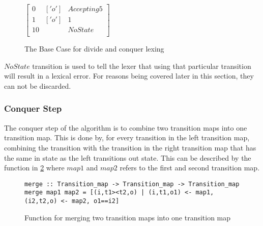\begin{figure}[!ht]
\begin{center}
$\left[\begin{array}{ccc}
0&['o']&Accepting 5\\
1&['o']&1\\
10& &NoState\\
\end{array}\right]$
\caption{The Base Case for divide and conquer lexing \label{fig:bascas}}
\end{center}
\end{figure}

$NoState$ transition is used to tell the lexer that using that particular 
transition will result in a lexical error. For reasons being covered later in
this section, they can not be discarded.

\subsubsection{Conquer Step}
The conquer step of the algorithm is to combine two transition maps into one
transition map. This is done by, for every transition in the left transition
map, combining the transition with the transition in the right transition map
that has the same in state as the left transitions out state. This can be
described by the function in \cref{fig:mergetransmap} where $map1$ and $map2$
refers to the first and second transition map.

\begin{figure}
\begin{lstlisting}
merge :: Transition_map -> Transition_map -> Transition_map
merge map1 map2 = [(i,t1><t2,o) | (i,t1,o1) <- map1, (i2,t2,o) <- map2, o1==i2]
\end{lstlisting}
\caption{Function for merging two transition maps into one transition map
  \label{fig:mergetransmap}}
\end{figure}

